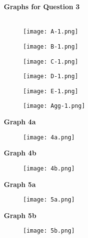 \documentclass[11pt]{SelfArxOneColBMN}
\begin{document}
\newpage
\noindent \textbf{Graphs for Question 3}\\\
\begin{figure}[h]
	\texttt{[image: A-1.png]}
\end{figure}
 \begin{figure}[h]
     \texttt{[image: B-1.png]}
                \end{figure}
                \pagebreak
                \begin{figure}[h]
                        \texttt{[image: C-1.png]}
                \end{figure}
                \begin{figure}[h]
                        \texttt{[image: D-1.png]}
                \end{figure}
                \begin{figure}[h]
                        \texttt{[image: E-1.png]}
                \end{figure}
                \begin{figure}[h]
                        \texttt{[image: Agg-1.png]}
                \end{figure}
\clearpage
\noindent \textbf{Graph 4a}
\begin{figure}[h]
        \texttt{[image: 4a.png]}
\end{figure}
\clearpage
\noindent \textbf{Graph 4b}
\begin{figure}[h]
	\texttt{[image: 4b.png]}
\end{figure}
\clearpage
\noindent \textbf{Graph 5a}
\begin{figure}[h]
        \texttt{[image: 5a.png]}
\end{figure}
\clearpage
\noindent \textbf{Graph 5b}
\begin{figure}[h]
        \texttt{[image: 5b.png]}
\end{figure}
\end{document}

